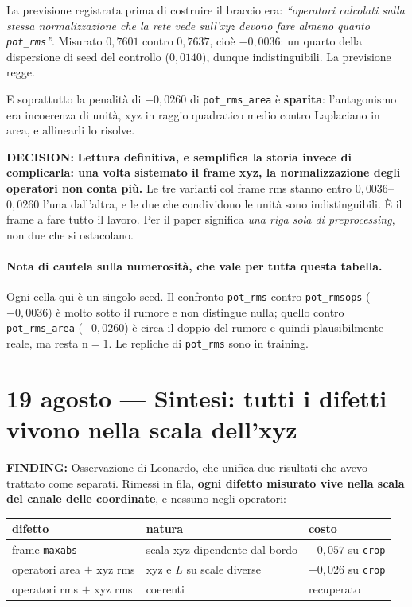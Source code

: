 \documentclass[11pt,a4paper]{article}
\newcommand{\finding}[1]{\textcolor{finding}{\textbf{FINDING:}} #1}
\newcommand{\decision}[1]{\textcolor{decision}{\textbf{DECISION:}} #1}
\begin{document}
La previsione registrata prima di costruire il braccio era: \emph{``operatori calcolati sulla
stessa normalizzazione che la rete vede sull'xyz devono fare almeno quanto \texttt{pot\_rms}''}.
Misurato $0{,}7601$ contro $0{,}7637$, cio\`e $-0{,}0036$: un quarto della dispersione di seed
del controllo ($0{,}0140$), dunque indistinguibili. La previsione regge.

E soprattutto la penalit\`a di $-0{,}0260$ di \texttt{pot\_rms\_area} \`e \textbf{sparita}:
l'antagonismo era incoerenza di unit\`a, xyz in raggio quadratico medio contro Laplaciano in
area, e allinearli lo risolve.

\decision{\textbf{Lettura definitiva, e semplifica la storia invece di complicarla: una volta
sistemato il frame xyz, la normalizzazione degli operatori non conta pi\`u.} Le tre varianti col
frame rms stanno entro $0{,}0036$--$0{,}0260$ l'una dall'altra, e le due che condividono le
unit\`a sono indistinguibili. \`E il frame a fare tutto il lavoro. Per il paper significa
\emph{una riga sola di preprocessing}, non due che si ostacolano.}

\paragraph{Nota di cautela sulla numerosit\`a, che vale per tutta questa tabella.} Ogni cella
qui \`e un singolo seed. Il confronto \texttt{pot\_rms} contro \texttt{pot\_rmsops}
($-0{,}0036$) \`e molto sotto il rumore e non distingue nulla; quello contro
\texttt{pot\_rms\_area} ($-0{,}0260$) \`e circa il doppio del rumore e quindi plausibilmente
reale, ma resta n$=1$. Le repliche di \texttt{pot\_rms} sono in training.


\section{19 agosto --- Sintesi: tutti i difetti vivono nella scala dell'xyz}

\finding{Osservazione di Leonardo, che unifica due risultati che avevo trattato come separati.
Rimessi in fila, \textbf{ogni difetto misurato vive nella scala del canale delle coordinate}, e
nessuno negli operatori:}

\begin{center}\small
\begin{tabular}{lll}
\toprule
difetto & natura & costo \\
\midrule
frame \texttt{maxabs} & scala xyz dipendente dal bordo & $-0{,}057$ su \texttt{crop} \\
operatori area $+$ xyz rms & xyz e $L$ su scale diverse & $-0{,}026$ su \texttt{crop} \\
operatori rms $+$ xyz rms & coerenti & recuperato \\
\bottomrule
\end{tabular}
\end{center}
\end{document}
